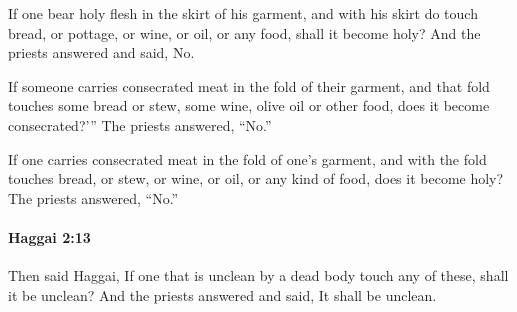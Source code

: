 			\begin{versebox}
					\item[BHS] 
					\item[LXX] 
					\item[ASV] If one bear holy flesh in the skirt of his garment, and with his skirt do touch bread, or pottage, or wine, or oil, or any food, shall it become holy? And the priests answered and said, No.
					\item[NIV] If someone carries consecrated meat in the fold of their garment, and that fold touches some bread or stew, some wine, olive oil or other food, does it become consecrated?’” The priests answered, “No.”
					\item[NRSV] If one carries consecrated meat in the fold of one’s garment, and with the fold touches bread, or stew, or wine, or oil, or any kind of food, does it become holy? The priests answered, “No.”
			\end{versebox}

		\paragraph{Haggai 2:13} %
			\label{HAGGAI-2-13}

			Then said Haggai, If one that is unclean by a dead body touch any of these, shall it be unclean? And the priests answered and said, It shall be unclean.

